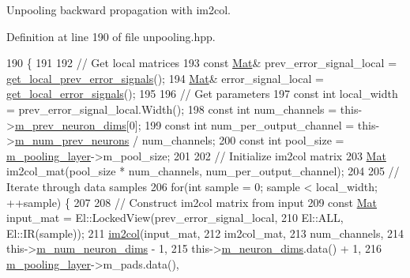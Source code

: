 Unpooling backward propagation with im2col. 



Definition at line 190 of file unpooling.\+hpp.


\begin{DoxyCode}
190                            \{
191 
192     \textcolor{comment}{// Get local matrices}
193     \textcolor{keyword}{const} \hyperlink{base_8hpp_a68f11fdc31b62516cb310831bbe54d73}{Mat}& prev\_error\_signal\_local = \hyperlink{classlbann_1_1Layer_a82827edc5e869960144f3ccb2172bfcd}{get\_local\_prev\_error\_signals}();
194     \hyperlink{base_8hpp_a68f11fdc31b62516cb310831bbe54d73}{Mat}& error\_signal\_local = \hyperlink{classlbann_1_1Layer_af178d00b9d878aa7d87754bff2a91f3a}{get\_local\_error\_signals}();
195 
196     \textcolor{comment}{// Get parameters}
197     \textcolor{keyword}{const} \textcolor{keywordtype}{int} local\_width = prev\_error\_signal\_local.Width();
198     \textcolor{keyword}{const} \textcolor{keywordtype}{int} num\_channels = this->\hyperlink{classlbann_1_1Layer_ae204d1a2a79606eaa117273857ff62a3}{m\_prev\_neuron\_dims}[0];
199     \textcolor{keyword}{const} \textcolor{keywordtype}{int} num\_per\_output\_channel = this->\hyperlink{classlbann_1_1Layer_ac7b30f4e28d58204bfcbb76886f9136d}{m\_num\_prev\_neurons} / num\_channels;
200     \textcolor{keyword}{const} \textcolor{keywordtype}{int} pool\_size = \hyperlink{classlbann_1_1unpooling__layer_ab15a8b0680685f80c7d995e617e97a9a}{m\_pooling\_layer}->m\_pool\_size;
201 
202     \textcolor{comment}{// Initialize im2col matrix}
203     \hyperlink{base_8hpp_a68f11fdc31b62516cb310831bbe54d73}{Mat} im2col\_mat(pool\_size * num\_channels, num\_per\_output\_channel);
204 
205     \textcolor{comment}{// Iterate through data samples}
206     \textcolor{keywordflow}{for}(\textcolor{keywordtype}{int} sample = 0; sample < local\_width; ++sample) \{
207 
208       \textcolor{comment}{// Construct im2col matrix from input}
209       \textcolor{keyword}{const} \hyperlink{base_8hpp_a68f11fdc31b62516cb310831bbe54d73}{Mat} input\_mat = El::LockedView(prev\_error\_signal\_local,
210                                            El::ALL, El::IR(sample));
211       \hyperlink{namespacelbann_aa3636a1979e40da2af91f30a12b90db9}{im2col}(input\_mat,
212              im2col\_mat,
213              num\_channels,
214              this->\hyperlink{classlbann_1_1Layer_adfd6178d21498c9095cd947ae1eb2d6a}{m\_num\_neuron\_dims} - 1,
215              this->\hyperlink{classlbann_1_1Layer_abb34bb8031f57a483e2e327a5f229f48}{m\_neuron\_dims}.data() + 1,
216              \hyperlink{classlbann_1_1unpooling__layer_ab15a8b0680685f80c7d995e617e97a9a}{m\_pooling\_layer}->m\_pads.data(),

\end{DoxyCode}
